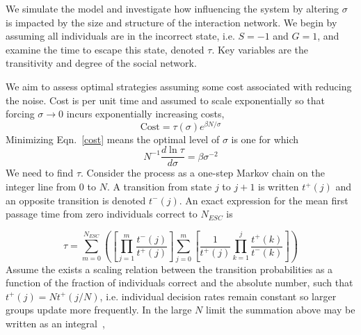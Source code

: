 \documentclass[aps,prl,twocolumn,showpacs,superscriptaddress,groupedaddress]{revtex4}
\begin{document}
We simulate the model and investigate how influencing the system by altering $\sigma$ is impacted by the size and structure of the interaction network. We begin by assuming all individuals are in the incorrect state, i.e. $S=-1$ and $G=1$, and examine the time to escape this state, denoted $\tau$. Key variables are the transitivity and degree of the social network.

We aim to assess optimal strategies assuming some cost associated with reducing the noise. Cost is per unit time and assumed to scale exponentially so that forcing $\sigma \rightarrow 0$ incurs exponentially increasing costs,
\begin{equation}
\mbox{Cost} = \tau (\sigma) e^{\beta N/\sigma}
\label{cost}
\end{equation}
Minimizing Eqn.~\ref{cost} means the optimal level of $\sigma$ is one for which
\begin{equation}
N^{-1} \frac{d \ln \tau}{d \sigma} = \beta \sigma^{-2}
\end{equation}
We need to find $\tau$.
Consider the process as a one-step Markov chain on the integer line from $0$ to $N$. A transition from state $j$ to $j+1$ is written $t^+(j)$ and an opposite transition is denoted $t^-(j)$. An exact expression for the mean first passage time from zero individuals correct to $N_{ESC}$ is \cite{gardiner}

\begin{equation}
\tau = \sum\limits_{m=0}^{N_{ESC}} \left( \left[ \prod\limits_{j=1}^{m} \frac{t^-(j)}{t^+(j)} \right] \sum\limits_{j=0}^{m} \left[\frac{1}{t^+(j)} \prod\limits_{k=1}^{j} \frac{t^+(k)}{t^-(k)}  \right]   \right)
\label{noapprox1}
\end{equation}
Assume the exists a scaling relation between the transition probabilities as a function of the fraction of individuals correct and the absolute number, such that $t^+(j) = N t^+(j/N)$, i.e. individual decision rates remain constant so larger groups update more frequently. In the large $N$ limit the summation above may be written as an integral~\cite{doering}, 
\end{document}
